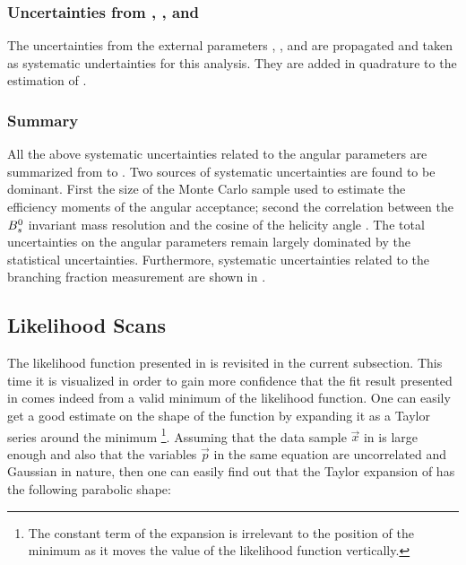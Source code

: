 \subsubsection{Uncertainties from \fdfs, \BRof\BdJpsiKst, and \BRof\BsJpsiPhi}
The uncertainties from the external parameters \fdfs, \BRof\BdJpsiKst, and \BRof\BsJpsiPhi are
propagated and taken as systematic undertainties for this analysis. They are added in quadrature to
the estimation of \BRof\BsJpsiKst.

\subsubsection{Summary}
\label{systSummary}
All the above systematic uncertainties related to the angular parameters are summarized from 
to . Two sources of systematic uncertainties are found to be dominant. First the size of the Monte
Carlo sample used to estimate the efficiency moments of the angular acceptance; second the correlation between the $B^0_s$ invariant
mass resolution and the cosine of the helicity angle \thetamu. The total uncertainties on the angular parameters remain largely dominated
by the statistical uncertainties. Furthermore, systematic uncertainties related to the branching fraction measurement
are shown in .

\subsection{Likelihood Scans}
\label{nllscans}

The likelihood function presented in  is revisited in the current subsection.
This time it is visualized in order to gain more confidence that the fit result presented in 
comes indeed from a valid minimum of the likelihood function. One can easily get a good estimate on the shape of the function
by expanding it as a Taylor series around the
minimum \footnote{The constant term of the
expansion is irrelevant to the position of the minimum as it moves the value of the likelihood function vertically.}.
Assuming that the data sample $\vec{x}$ in  is large enough and also that the variables $\vec{p}$
in the same equation are uncorrelated and Gaussian in nature, then one can easily find out that the Taylor expansion
of  has the following parabolic shape:

